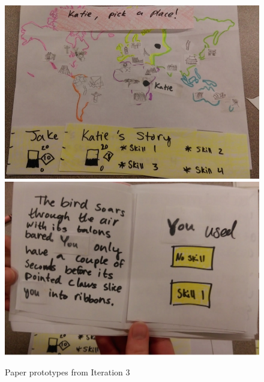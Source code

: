 \documentclass[a4paper]{article}
\begin{document}
\begin{figure}
\centering
\includegraphics[width=\figwidth]{paper-prototype}
\includegraphics[width=\figwidth]{paper-prototype-2}
\caption{Paper prototypes from Iteration 3}
\label{fig:paper-prototype}
\end{figure}
\end{document}

